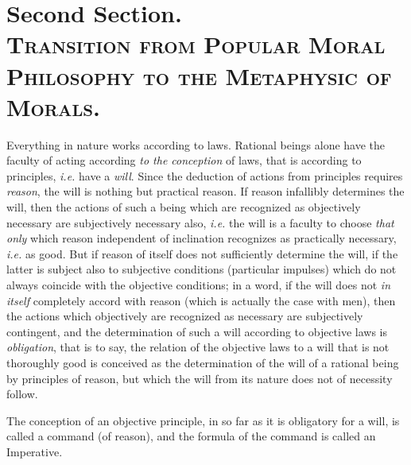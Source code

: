 \section*{Second Section.\\\smaller\textsc{Transition from Popular
Moral Philosophy to the Metaphysic of Morals.}}


Everything in nature works according to laws. Rational beings
alone have the faculty of acting according \textit{to the conception}
of laws, that is according to principles, \textit{i.e.} have a
\textit{will}. Since the deduction of actions from principles requires
\textit{reason}, the will is nothing but practical reason. If reason
infallibly determines the will, then the actions of such a being which
are recognized as objectively necessary are subjectively necessary
also, \textit{i.e.} the will is a faculty to choose \textit{that only}
which reason independent of inclination recognizes as practically
necessary, \textit{i.e.} as good. But if reason of itself does not
sufficiently determine the will, if the latter is subject also to
subjective conditions (particular impulses) which do not always
coincide with the objective conditions; in a word, if the will does
not \textit{in itself} completely accord with reason (which is
actually the case with men), then the actions which objectively are
recognized as necessary are subjectively contingent, and the
determination of  such a will according to objective laws is
\textit{obligation}, that is to say, the relation of the objective
laws to a will that is not thoroughly good is conceived as the
determination of the will of a rational being by principles of reason,
but which the will from its nature does not of necessity follow.

The conception of an objective principle, in so far as it is
obligatory for a will, is called a command (of reason), and the
formula of the command is called an Imperative.


